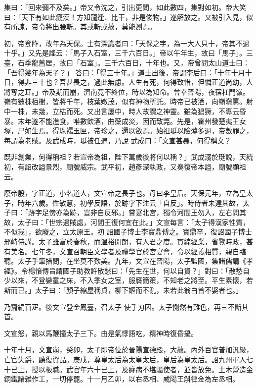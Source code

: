 \begin{pinyinscope}
 集曰：「回來彌不及矣。」帝又令沈之，引出更問，如此數四，集對如初。帝大笑曰：「天下有如此癡漢！方知龍逢、比干，非是俊物。」遂解放之。又被引入見，似有所諫，帝令將出腰斬。其或斬或赦，莫能測焉。



 初，帝登阼，改年為天保。士有深識者曰：「天保之字，為一大人只十，帝其不過十乎。」又先是謠云：「馬子入石室，三千六百日。」帝以午年生，故曰「馬子」。三臺，石季龍舊居，故曰「石室」。三千六百日，十年也。又，帝曾問太山道士曰：「吾得幾年為天子？」
 答曰：「得三十年。」道士出後，帝謂李后曰：「十年十月十日，得非三十也？吾甚畏之，過此無慮。人生有死，何得致惜，但憐正道尚幼，人將奪之耳。」帝及期而崩，濟南竟不終位，時以為知命。曾幸晉陽，夜宿杠門嶺。嶺有數株栢樹，皆將千年，枝葉嫩茂，似有神物所託。時帝已被酒，向嶺瞋罵。射中一株，未幾，立枯而死。又出言屢中，時人故謂之神靈。雖為猖獗，不專云昏暴。末年遂不能進食，唯數飲酒，曲蘗成災，因而致斃。先是，霍州發楚夷王女塚，尸如生焉。得珠襦玉匣，帝珍之，還以斂焉。始祖珽以險薄多過，帝數罪之，每謂為老賊。及武成時，珽被任遇，乃說
 武成曰：「文宣甚暴，何得稱文？



 既非創業，何得稱祖？若宣帝為祖，陛下萬歲後將何以稱？」武成溺於珽說，天統初，有詔改謚景烈，廟號威宗。武平初，趙彥深執政，又奏復帝本謚，廟號顯祖云。



 廢帝殷，字正道，小名道人，文宣帝之長子也。母曰李皇后。天保元年，立為皇太子，時年六歲。性敏慧，初學反語，於跡字下注云「自反」。時侍者未達其故，太子曰：「跡字足傍亦為跡，豈非自反邪。」嘗宴北宮，獨令河間王勿入，左右問其故，太子曰：「世宗遇賊處，河間王復何宜在此。」文宣每言：「太子得漢家性質，不似我」，欲廢之，立太原王。初
 詔國子博士李寶鼎傅之。寶鼎卒，復詔國子博士邢峙侍講。太子雖富於春秋，而溫裕開朗，有人君之度。貫綜經業，省覽時政，甚有美名。七年冬，文宣召朝臣文學者及禮學官於宮宴會，令以經義相質，親自臨聽。太子手筆措問，在坐莫不歎美。九年，文宣在晉陽，太子監國，集諸儒講《孝經》。令楊愔傳旨謂國子助教許散愁曰：「先生在世，何以自資？」對曰：「散愁自少以來，不登孌童之床，不入季女之室，服膺簡策，不知老之將至。平生素懷，若斯而已。」太子曰：「顏子縮屋稱貞，柳下嫗而不亂，未若此翁白首不娶者也。」



 乃齎絹百疋。後文宣登金鳳臺，召太子
 使手刃囚。太子惻然有難色，再三不斷其首。



 文宣怒，親以馬鞭撞太子三下。由是氣悸語吃，精神時復昏擾。



 十年十月，文宣崩，癸卯，太子即帝位於晉陽宣德殿，大赦。內外百官普加汎級，亡官失爵，聽復資品。庚戌，尊皇太后為太皇太后，皇后為皇太后。詔九州軍人七十已上，授以板職。武官年六十已上，及癃病不堪驅使者，並皆放免。土木營造金銅鐵諸雜作工，一切停罷。十一月乙卯，以右丞相、咸陽王斛律金為左丞相。




\end{pinyinscope}
